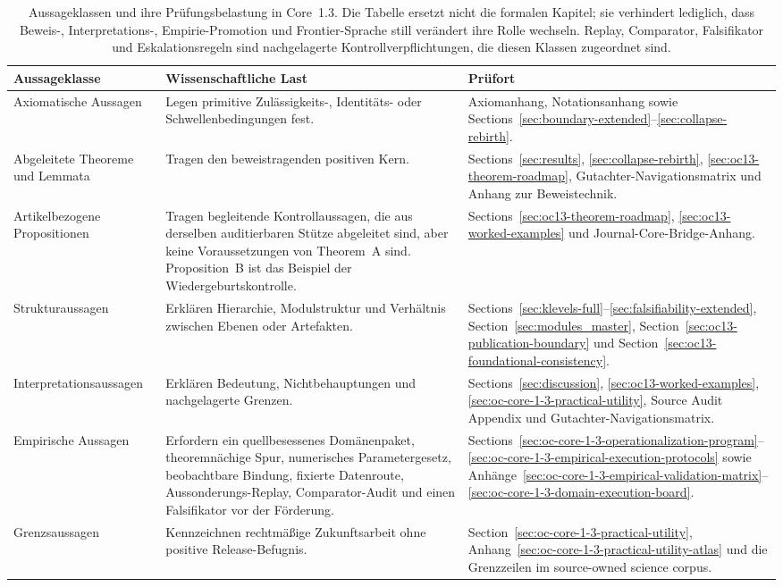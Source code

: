 \begin{table}[htbp]
\centering
\begingroup
\footnotesize
\RaggedRight
\setlength{\tabcolsep}{4pt}
\begin{tabular}{@{}L{0.21\textwidth}L{0.28\textwidth}L{0.39\textwidth}@{}}
\toprule
\textbf{Aussageklasse} & \textbf{Wissenschaftliche Last} & \textbf{Prüfort} \\
\midrule
Axiomatische Aussagen & Legen primitive Zulässigkeits-, Identitäts- oder Schwellenbedingungen fest. & Axiomanhang, Notationsanhang sowie Sections~\ref{sec:boundary-extended}--\ref{sec:collapse-rebirth}. \\
Abgeleitete Theoreme und Lemmata & Tragen den beweistragenden positiven Kern. & Sections~\ref{sec:results}, \ref{sec:collapse-rebirth}, \ref{sec:oc13-theorem-roadmap}, Gutachter-Navigationsmatrix und Anhang zur Beweistechnik. \\
Artikelbezogene Propositionen & Tragen begleitende Kontrollaussagen, die aus derselben auditierbaren Stütze abgeleitet sind,
      aber keine Voraussetzungen von Theorem~A sind. Proposition~B ist das Beispiel der Wiedergeburtskontrolle. & Sections~\ref{sec:oc13-theorem-roadmap}, \ref{sec:oc13-worked-examples} und Journal-Core-Bridge-Anhang. \\
Strukturaussagen & Erklären Hierarchie, Modulstruktur und Verhältnis zwischen Ebenen oder Artefakten. & Sections~\ref{sec:klevels-full}--\ref{sec:falsifiability-extended}, Section~\ref{sec:modules_master}, Section~\ref{sec:oc13-publication-boundary} und Section~\ref{sec:oc13-foundational-consistency}. \\
Interpretationsaussagen & Erklären Bedeutung, Nichtbehauptungen und nachgelagerte Grenzen. & Sections~\ref{sec:discussion}, \ref{sec:oc13-worked-examples}, \ref{sec:oc-core-1-3-practical-utility}, Source Audit Appendix und Gutachter-Navigationsmatrix. \\
Empirische Aussagen & Erfordern ein quellbesessenes Domänenpaket, theoremnächige Spur, numerisches
      Parametergesetz, beobachtbare Bindung, fixierte Datenroute, Aussonderungs-Replay,
      Comparator-Audit und einen Falsifikator vor der Förderung. & Sections~\ref{sec:oc-core-1-3-operationalization-program}--\ref{sec:oc-core-1-3-empirical-execution-protocols} sowie Anhänge~\ref{sec:oc-core-1-3-empirical-validation-matrix}--\ref{sec:oc-core-1-3-domain-execution-board}. \\
Grenzsaussagen & Kennzeichnen rechtmäßige Zukunftsarbeit ohne positive Release-Befugnis. & Section~\ref{sec:oc-core-1-3-practical-utility}, Anhang~\ref{sec:oc-core-1-3-practical-utility-atlas} und die Grenzzeilen im source-owned science corpus. \\
\bottomrule
\end{tabular}
\endgroup
\caption{Aussageklassen und ihre Prüfungsbelastung in Core~1.3. Die Tabelle ersetzt nicht die formalen Kapitel;
sie verhindert lediglich, dass Beweis-, Interpretations-, Empirie-Promotion und Frontier-Sprache still
verändert ihre Rolle wechseln. Replay, Comparator, Falsifikator und Eskalationsregeln sind nachgelagerte
Kontrollverpflichtungen, die diesen Klassen zugeordnet sind.}
\label{tab:oc13-statement-classes}
\end{table}

